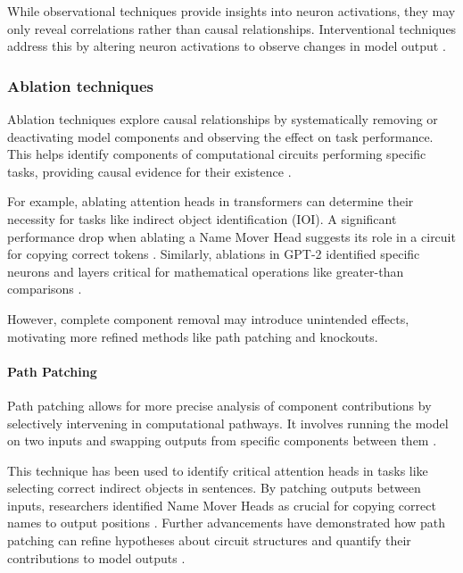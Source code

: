 \documentclass[sigconf,authoryear]{acmart}
\begin{document}
  While observational techniques provide insights into neuron activations, they may only reveal correlations rather than causal relationships. Interventional techniques address this by altering neuron activations to observe changes in model output \citep{bereska_mechanistic_2024,rai2024practicalreviewmechanisticinterpretability}.
  
  \subsubsection{Ablation techniques}
  
  Ablation techniques explore causal relationships by systematically removing or deactivating model components and observing the effect on task performance. This helps identify components of computational circuits performing specific tasks, providing causal evidence for their existence \citep{wang2022interpretabilitywildcircuitindirect, hanna2023doesgpt2computegreaterthan}.
  
  For example, ablating attention heads in transformers can determine their necessity for tasks like indirect object identification (IOI). A significant performance drop when ablating a Name Mover Head suggests its role in a circuit for copying correct tokens \citep{wang2022interpretabilitywildcircuitindirect}. Similarly, ablations in GPT-2 identified specific neurons and layers critical for mathematical operations like greater-than comparisons \citep{hanna2023doesgpt2computegreaterthan}.
  
  However, complete component removal may introduce unintended effects, motivating more refined methods like path patching and knockouts.
  
  \paragraph{Path Patching}
  Path patching allows for more precise analysis of component contributions by selectively intervening in computational pathways. It involves running the model on two inputs and swapping outputs from specific components between them \citep{wang2022interpretabilitywildcircuitindirect, goldowskydill2023localizingmodelbehaviorpath}.
  
  This technique has been used to identify critical attention heads in tasks like selecting correct indirect objects in sentences. By patching outputs between inputs, researchers identified Name Mover Heads as crucial for copying correct names to output positions \citep{wang2022interpretabilitywildcircuitindirect}. Further advancements have demonstrated how path patching can refine hypotheses about circuit structures and quantify their contributions to model outputs \citep{goldowskydill2023localizingmodelbehaviorpath}.
  
\end{document}
